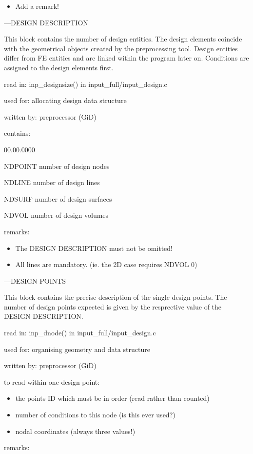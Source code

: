 \begin{itemize}
\item Add a remark!
\end{itemize}
---DESIGN DESCRIPTION

This block contains the number of design entities. The design elements
coincide with the geometrical objects created by the preprocessing
tool. Design entities differ from FE entities and are linked within
the program later on. Conditions are assigned to the design elements
first. 

read in: inp\_designsize() in input\_full/input\_design.c 

used for: allocating design data structure 

written by: preprocessor (GiD) 

contains: 

\begin{lyxlist}{00.00.0000}
\item [{NDPOINT}] number of design nodes 
\item [{NDLINE}] number of design lines 
\item [{NDSURF}] number of design surfaces 
\item [{NDVOL}] number of design volumes 
\end{lyxlist}
remarks: 

\begin{itemize}
\item The DESIGN DESCRIPTION must not be omitted! 
\item All lines are mandatory. (ie. the 2D case requires NDVOL 0)
\end{itemize}
---DESIGN POINTS

This block contains the precise description of the single design points.
The number of design points expected is given by the resprective value
of the DESIGN DESCRIPTION. 

read in: inp\_dnode() in input\_full/input\_design.c 

used for: organising geometry and data structure 

written by: preprocessor (GiD) 

to read within one design point: 

\begin{itemize}
\item the points ID which must be in order (read rather than counted) 
\item number of conditions to this node (is this ever used?) 
\item nodal coordinates (always three values!) 
\end{itemize}
remarks: 

